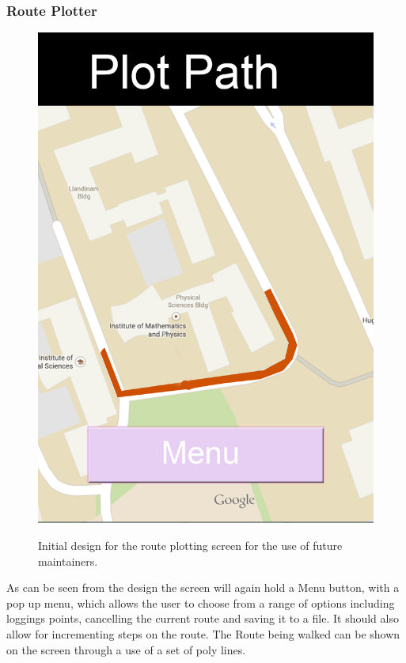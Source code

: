 \subsubsection{Route Plotter}
\begin{figure}[h]
\includegraphics[scale=0.6]{Design/Plot.png}\\
\caption[Initial Plot Design]{Initial design for the route plotting screen for the use of future maintainers.}
\end{figure}
As can be seen from the design the screen will again hold a Menu button, with a pop up menu, which allows the user to choose from a range of options including loggings points, cancelling the current route and saving it to a file. It should also allow for incrementing steps on the route. The Route being walked can be shown on the screen through a use of a set of poly lines.
\newpage
